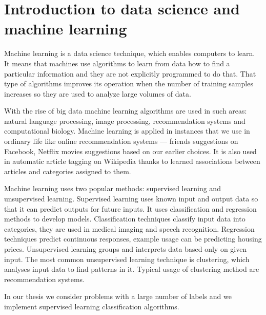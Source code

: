 \section{Introduction to data science and machine learning}

Machine learning is a data science technique, which enables computers to learn.
It means that machines use algorithms to learn from data how to find a particular information and
they are not explicitly programmed to do that.
That type of algorithms improves its operation when the number of training samples increases so they are used to analyze large volumes of data.

With the rise of big data machine learning algorithms are used in such areas: natural language processing, image processing, recommendation systems and computational biology. Machine learning is applied in instances that we use in ordinary life like online recommendation systems --- friends suggestions on Facebook, Netflix movies suggestions based on our earlier choices.
It is also used in automatic article tagging on Wikipedia thanks to learned
associations between articles and categories assigned to them.

Machine learning uses two popular methods: supervised learning and unsupervised learning.
Supervised learning uses known input and output data so that it can predict outputs for future inputs.
It uses classification and regression methods to develop models.
Classification techniques classify input data into categories, they are used in medical imaging and speech recognition.
Regression techniques predict continuous responses, example usage can be predicting housing prices. Unsupervised learning groups and interprets data based only on given input.
The most common unsupervised learning technique is clustering,
which analyses input data to find patterns in it. 
Typical usage of clustering method are recommendation systems.

In our thesis we consider problems with a large number of labels and we implement supervised learning classification algorithms.
